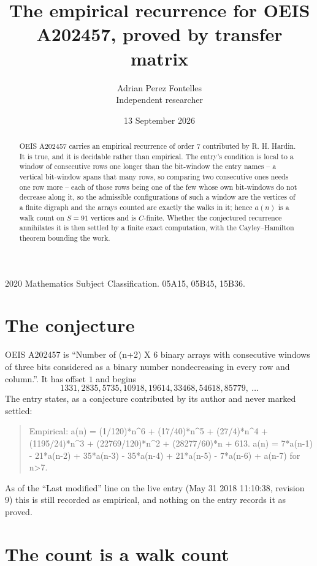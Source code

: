 \documentclass[11pt,a4paper]{article}
\title{The empirical recurrence for OEIS A202457, proved by transfer matrix}
\author{Adrian Perez Fontelles\\ \small Independent researcher}
\date{13 September 2026}
\theoremstyle{plain}
\theoremstyle{definition}
\begin{document}
\maketitle

\begin{abstract}
OEIS A202457 carries an empirical recurrence of order $7$ contributed by R. H. Hardin. It is
true, and it is decidable rather than empirical. The entry's condition is local to a window of consecutive rows one longer than the bit-window the entry names -- a vertical bit-window spans that many rows, so comparing two consecutive ones needs one row more -- each of those rows being one of the few whose own bit-windows do not decrease along it, so
the admissible configurations of such a window are the vertices of a finite digraph and the
arrays counted are exactly the walks in it; hence $a(n)$ is a walk count on $S=91$ vertices
and is $C$-finite. Whether the conjectured recurrence annihilates it is then settled by a
finite exact computation, with the Cayley--Hamilton theorem bounding the work.
\end{abstract}

\noindent\small 2020 Mathematics Subject Classification. 05A15, 05B45, 15B36.\normalsize

\section{The conjecture}

OEIS A202457 is ``Number of (n+2) X 6 binary arrays with consecutive windows of three bits considered as a binary number nondecreasing in every row and column.''. It has offset $1$ and begins
\[
1331, 2835, 5735, 10918, 19614, 33468, 54618, 85779,\ \dots
\]
The entry states, as a conjecture contributed by its author and never marked settled:
\begin{quote}
Empirical: a(n) = (1/120)*n\^{}6 + (17/40)*n\^{}5 + (27/4)*n\^{}4 + (1195/24)*n\^{}3 + (22769/120)*n\^{}2 + (28277/60)*n + 613. a(n) = 7*a(n-1) - 21*a(n-2) + 35*a(n-3) - 35*a(n-4) + 21*a(n-5) - 7*a(n-6) + a(n-7) for n>7.
\end{quote}
As of the ``Last modified'' line on the live entry (May 31 2018 11:10:38, revision 9) this is still
recorded as empirical, and nothing on the entry records it as proved.

\section{The count is a walk count}
\end{document}
